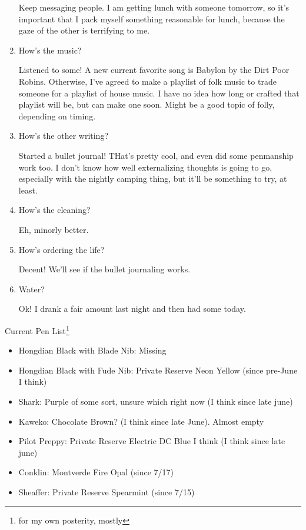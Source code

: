\documentclass[12pt]{article}
\renewcommand{\,}{\textsuperscript{,}}
\begin{document}
\begin{enumerate}
Keep messaging people. I am getting lunch with someone tomorrow, so it's important that I pack myself something reasonable for lunch, because the gaze of the other is terrifying to me.

\item How's the music?

Listened to some! A new current favorite song is Babylon by the Dirt Poor Robins.  
Otherwise, I've agreed to make a playlist of folk music to trade someone for a playlist of house music.  
I have no idea how long or crafted that playlist will be, but can make one soon. Might be a good topic of folly, depending on timing.

\item How's the other writing?

Started a bullet journal! THat's pretty cool, and even did some penmanship work too.  
I don't know how well externalizing thoughts is going to go, especially with the nightly camping thing, but it'll be something to try, at least.

\item How's the cleaning?

Eh, minorly better.

\item How's ordering the life?

Decent! We'll see if the bullet journaling works.

\item Water?

Ok! I drank a fair amount last night and then had some today.

\end{enumerate}

Current Pen List\footnote{for my own posterity, mostly}

\begin{itemize}

\item Hongdian Black with Blade Nib: Missing  
\item Hongdian Black with Fude Nib: Private Reserve Neon Yellow (since pre-June I think)  
\item Shark: Purple of some sort, unsure which right now (I think since late june)  
\item Kaweko: Chocolate Brown? (I think since late June). Almost empty  
\item Pilot Preppy: Private Reserve Electric DC Blue I think (I think since late june)  
\item Conklin: Montverde Fire Opal (since 7/17)  
\item Sheaffer: Private Reserve Spearmint (since 7/15)

\end{itemize}
\end{document}
